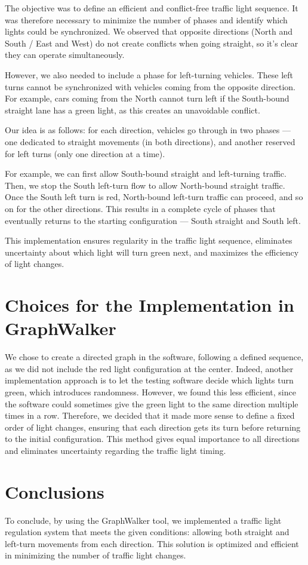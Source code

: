 \documentclass[twocolumn,10pt]{article}
\begin{document}
The objective was to define an efficient and conflict-free traffic light sequence. It was therefore necessary to minimize the number of phases and identify which lights could be synchronized. We observed that opposite directions (North and South / East and West) do not create conflicts when going straight, so it's clear they can operate simultaneously.

However, we also needed to include a phase for left-turning vehicles. These left turns cannot be synchronized with vehicles coming from the opposite direction. For example, cars coming from the North cannot turn left if the South-bound straight lane has a green light, as this creates an unavoidable conflict.

Our idea is as follows: for each direction, vehicles go through in two phases — one dedicated to straight movements (in both directions), and another reserved for left turns (only one direction at a time).

For example, we can first allow South-bound straight and left-turning traffic. Then, we stop the South left-turn flow to allow North-bound straight traffic. Once the South left turn is red, North-bound left-turn traffic can proceed, and so on for the other directions. This results in a complete cycle of phases that eventually returns to the starting configuration — South straight and South left.

This implementation ensures regularity in the traffic light sequence, eliminates uncertainty about which light will turn green next, and maximizes the efficiency of light changes.

\section{Choices for the Implementation in GraphWalker}

We chose to create a directed graph in the software, following a defined sequence, as we did not include the red light configuration at the center. Indeed, another implementation approach is to let the testing software decide which lights turn green, which introduces randomness. However, we found this less efficient, since the software could sometimes give the green light to the same direction multiple times in a row. Therefore, we decided that it made more sense to define a fixed order of light changes, ensuring that each direction gets its turn before returning to the initial configuration. This method gives equal importance to all directions and eliminates uncertainty regarding the traffic light timing.

\section{Conclusions}

To conclude, by using the GraphWalker tool, we implemented a traffic light regulation system that meets the given conditions: allowing both straight and left-turn movements from each direction. This solution is optimized and efficient in minimizing the number of traffic light changes.

\end{document}
